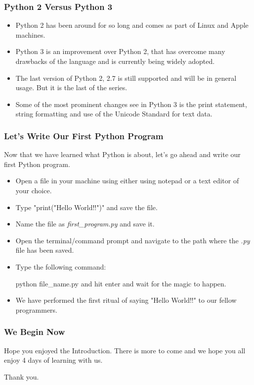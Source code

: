 \documentclass{beamer}
\begin{document}
\begin{frame}
\frametitle{Python 2 Versus Python 3}
\begin{itemize}
\item Python 2 has been around for so long and comes as part of Linux and Apple machines.
\item Python 3 is an improvement over Python 2, that has overcome many drawbacks of the language and is currently being widely adopted.
\item The last version of Python 2, 2.7 is still supported and will be in general usage. But it is the last of the series.
\item Some of the most prominent changes see in Python 3 is the print statement, string formatting and use of the Unicode Standard for text data.
\end{itemize}
\end{frame}

\begin{frame}
\frametitle{Let's Write Our First Python Program}
Now that we have learned what Python is about, let's go ahead and write our first Python program.

\begin{itemize}
\item Open a file in your machine using either using notepad or a text editor of your choice.
\item Type "print("Hello World!!")" and save the file.
\item Name the file as \textit{first\_program.py} and save it.
\item Open the terminal/command prompt and navigate to the path where the \textit{.py} file has been saved.
\item Type the following command:

python file\_name.py and hit enter and wait for the magic to happen.
\item We have performed the first ritual of saying "Hello World!!" to our fellow programmers.
\end{itemize}
\end{frame}

\begin{frame}
\frametitle{We Begin Now}
\centering
Hope you enjoyed the Introduction. There is more to come and we hope you all enjoy 4 days of learning with us.


Thank you. 
\end{frame}
\end{document}
